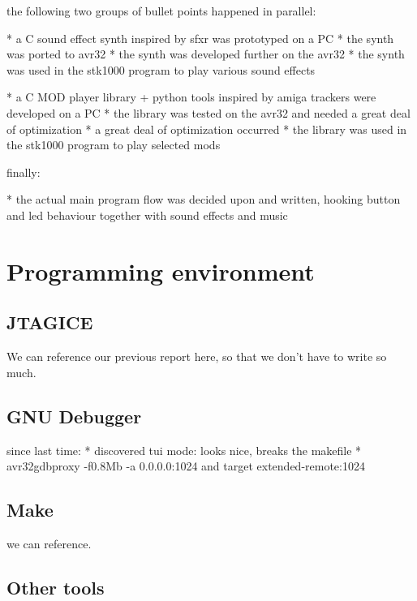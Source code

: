 the following two groups of bullet points happened in parallel:

* a C sound effect synth inspired by sfxr was prototyped on a PC
* the synth was ported to avr32
* the synth was developed further on the avr32
* the synth was used in the stk1000 program to play various sound effects

* a C MOD player library + python tools inspired by amiga trackers were developed on a PC
* the library was tested on the avr32 and needed a great deal of optimization
* a great deal of optimization occurred 
* the library was used in the stk1000 program to play selected mods


finally:

* the actual main program flow was decided upon and written, hooking button and led behaviour together with sound effects and music





\section{Programming environment}

\subsection{JTAGICE}
We can reference our previous report here, so that we don't have to write so much.

\subsection{GNU Debugger}
since last time:
* discovered tui mode: looks nice, breaks the makefile
* avr32gdbproxy -f0.8Mb -a 0.0.0.0:1024 and target extended-remote:1024

\subsection{Make}
we can reference.

\subsection{Other tools}

